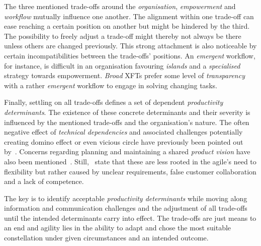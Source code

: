 The three mentioned trade-offs around the \emph{organisation}, \emph{empowerment} and \emph{workflow} mutually influence one another. The alignment within one trade-off can ease reaching a certain position on another but might be hindered by the third. The possibility to freely adjust a trade-off might thereby not always be there unless others are changed previously. This strong attachment is also noticeable by certain incompatibilities between the trade-offs' positions. An \emph{emergent} workflow, for instance, is difficult in an organisation favouring \emph{islands} and a \emph{specialised} strategy towards empowerment. \emph{Broad} \acp{XFT} prefer some level of \emph{transparency} with a rather \emph{emergent} workflow to engage in solving changing tasks. 

Finally, settling on all trade-offs defines a set of dependent \emph{productivity determinants}. The existence of these concrete determinants and their severity is influenced by the mentioned trade-offs and the organisation's nature. The often negative effect of \emph{technical dependencies} and associated challenges potentially creating domino effect or even vicious circle have previously been pointed out by~\citet{nelson2013technicaldependencies}. Concerns regarding planning and maintaining a shared \emph{product vision} have also been mentioned~\citep{badampudi2013proddelay}. Still,~\citet{badampudi2013proddelay} state that these are less rooted in the agile's need to flexibility but rather caused by unclear requirements, false customer collaboration and a lack of competence. 

The key is to identify acceptable \emph{productivity determinants} while moving along information and communication challenges and the adjustment of all trade-offs until the intended determinants carry into effect. The trade-offs are just means to an end and agility lies in the ability to adapt and chose the most suitable constellation under given circumstances and an intended outcome.
